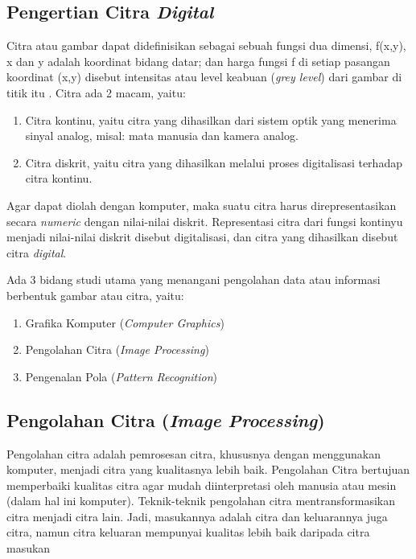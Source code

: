 	\subsection{Pengertian Citra \emph{Digital}}
	Citra atau gambar dapat didefinisikan sebagai sebuah fungsi dua dimensi, f(x,y), x dan y adalah koordinat bidang datar; dan harga fungsi f di setiap pasangan koordinat (x,y) disebut intensitas atau level keabuan (\emph{grey level}) dari gambar di titik itu \cite{hermawati}. Citra ada 2 macam, yaitu:
	\begin{enumerate}
		\item Citra kontinu, yaitu citra yang dihasilkan dari sistem optik yang menerima sinyal analog, misal: mata manusia dan kamera analog.
		\item Citra diskrit, yaitu citra yang dihasilkan melalui proses digitalisasi terhadap citra kontinu.
	\end{enumerate}
	
	Agar dapat diolah dengan komputer, maka suatu citra harus direpresentasikan secara \emph{numeric} dengan nilai-nilai diskrit. Representasi citra dari fungsi kontinyu menjadi nilai-nilai diskrit disebut digitalisasi, dan citra yang dihasilkan disebut citra \emph{digital}.
	
	Ada 3 bidang studi utama yang menangani pengolahan data atau informasi berbentuk gambar atau citra, yaitu:
	\begin{enumerate}
		\item Grafika Komputer (\emph{Computer Graphics})
		\item Pengolahan Citra (\emph{Image Processing})
		\item Pengenalan Pola (\emph{Pattern Recognition})
	\end{enumerate}
	
	\subsection{Pengolahan Citra (\emph{Image Processing})}
	Pengolahan citra adalah pemrosesan citra, khususnya dengan menggunakan komputer, menjadi citra yang kualitasnya lebih baik. Pengolahan Citra bertujuan memperbaiki kualitas citra agar mudah diinterpretasi oleh manusia atau mesin (dalam hal ini komputer). Teknik-teknik pengolahan citra mentransformasikan citra menjadi citra lain. Jadi, masukannya adalah citra dan keluarannya juga citra, namun citra keluaran mempunyai kualitas lebih baik daripada citra masukan \cite{munir04}
	
